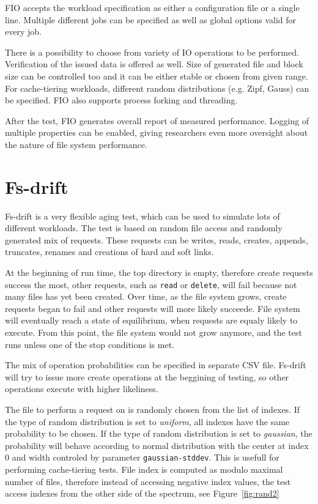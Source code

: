 \documentclass[
  color, %
  table, %
  lof,   %
  lot,   %
]{fithesis3}
\begin{document}
FIO accepts the workload specification as either a configuration file or a single line. Multiple different jobs can be specified as well as global options valid for every job. 

There is a possibility to choose from variety of IO operations to be performed. Verification of the issued data is offered as well. Size of generated file and block size can be controlled too and it can be either stable or chosen from given range. For cache-tiering workloads, different random distributions (e.g. Zipf, Gauss) can be specified. FIO also supports process forking and threading.

After the test, FIO generates overall report of measured performance. Logging of multiple properties can be enabled, giving researchers even more oversight about the nature of file system performance.

\section{Fs-drift}
Fs-drift is a very flexible aging test, which can be used to simulate lots of different workloads. The test is based on random file access and randomly generated mix of requests. These requests can be writes, reads, creates, appends, truncates, renames and creations of hard and soft links.

At the beginning of run time, the top directory is empty, therefore create requests success the most, other requests, such as \texttt{read} or \texttt{delete}, will fail because not many files has yet been created. Over time, as the file system grows, create requests began to fail and other requests will more likely succeede. File system will eventually reach a state of equilibrium, when requests are equaly likely to execute. From this point, the file system would not grow anymore, and the test runs unless one of the stop conditions is met.

The mix of operation probabilities can be specified in separate CSV file. Fs-drift will try to issue more create operations at the beggining of testing, so other operations execute with higher likeliness.

The file to perform a request on is randomly chosen from the list of indexes. If the type of random distribution is set to \emph{uniform}, all indexes have the same probability to be chosen. If the type of random distribution is set to \emph{gaussian}, the probability will behave according to normal distribution with the center at index 0 and width controled by parameter \texttt{gaussian-stddev}. This is usefull for performing cache-tiering tests. File index is computed as modulo maximal number of files, therefore instead of accessing negative index values, the test access indexes from the other side of the spectrum, see Figure~\ref{fig:rand2}
\end{document}
